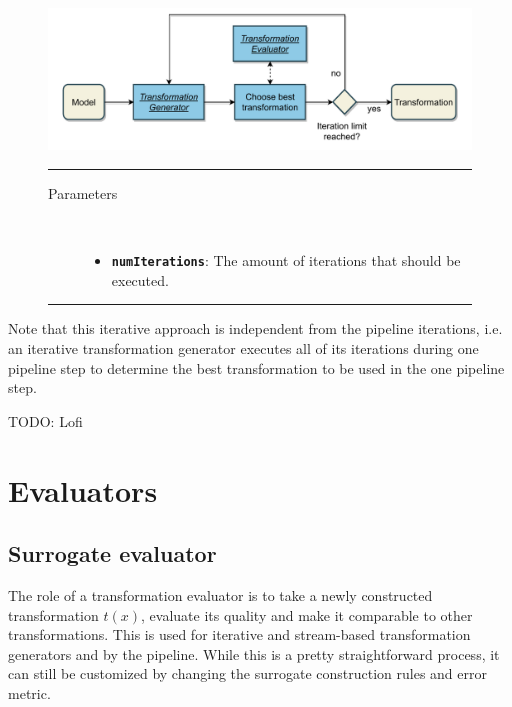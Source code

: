 \documentclass[
  a4paper,  %
  twoside,  %
  bibliography=totoc,
  headsepline,
  cleardoublepage=empty,
  parskip=half,
  draft=false
]{scrbook}
\newcommand{\delimit}{{\color{silver}\noindent\rule{\textwidth}{1pt}}}
\begin{document}
\begin{mdframed}[style=style,frametitle={Transformation generator (iterative)}]
\begin{figure}[H]
	\includegraphics[width=\textwidth]{graphics/TransformationGen_Iterative.pdf}

\delimit

\begin{description}
\item[Parameters] {~ \begin{itemize}[\null]
\item \texttt{\textbf{numIterations}}: The amount of iterations that should be executed.
\end{itemize}}
\end{description}

\delimit
{}
\label{fig:itg}
\end{figure}
\end{mdframed}


Note that this iterative approach is independent from the pipeline iterations, i.e. an iterative transformation generator executes all of its iterations during one pipeline step to determine the best transformation to be used in the one pipeline step.

TODO: Lofi

\newpage
\section {Evaluators}

\subsection {Surrogate evaluator}
\label{sec:se}

The role of a transformation evaluator is to take a newly constructed transformation $t(x)$, evaluate its quality and make it comparable to other transformations.
This is used for iterative and stream-based transformation generators and by the pipeline.
While this is a pretty straightforward process, it can still be customized by changing the surrogate construction rules and error metric.
\end{document}
